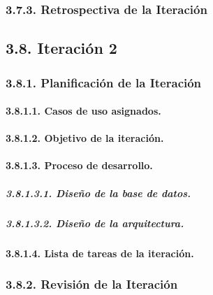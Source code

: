 \subsubsection{3.7.3. Retrospectiva de la Iteración}


\subsection{3.8. Iteración 2}

\subsubsection{3.8.1. Planificación de la Iteración}

\paragraph{3.8.1.1. Casos de uso asignados.}


\paragraph{3.8.1.2. Objetivo de la iteración.}


\paragraph{3.8.1.3. Proceso de desarrollo.}

\subparagraph{3.8.1.3.1. Diseño de la base de datos.}


\subparagraph{3.8.1.3.2. Diseño de la arquitectura.}


\paragraph{3.8.1.4. Lista de tareas de la iteración.}


\subsubsection{3.8.2. Revisión de la Iteración}

